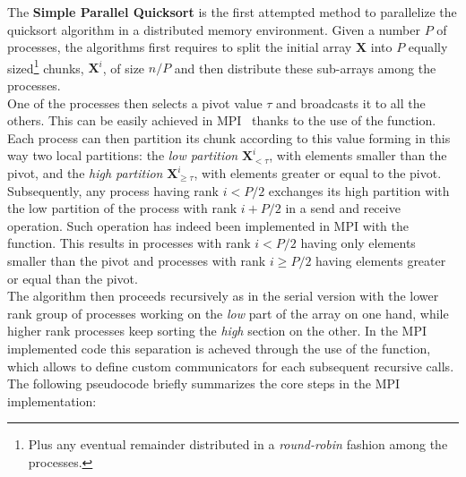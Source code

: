 \documentclass[../main.tex]{subfiles}
\begin{document}
The \textbf{Simple Parallel Quicksort} is the first attempted method to
parallelize the quicksort algorithm in a distributed memory environment.
Given a number $P$ of processes, the algorithms first requires to split the
initial array $\mathbf{X}$ into $P$ equally sized\footnote{Plus any eventual remainder distributed in a \textit{round-robin} fashion among the processes.} chunks, $\mathbf{X}^{i}$, of size $n/P$ and then
distribute these sub-arrays among the processes.\\
One of the processes then selects a pivot value $\tau$ and broadcasts it to all the others. This can be easily achieved in MPI~\cite{mpi} thanks to the use of the  function. Each process can then partition its chunk according to this value forming in this way two local partitions: the \textit{low partition} $\mathbf{X}^{i}_{< \tau}$, with elements smaller than the pivot, and the \textit{high partition} $\mathbf{X}^{i}_{\geq \tau}$, with elements greater or equal to the pivot.\\
Subsequently, any process having rank $i < P/2$ exchanges its high partition
with the low partition of the process with rank $i + P/2$ in a send and receive
operation. Such operation has indeed been implemented in MPI with the  function. This results in processes with rank $i < P/2$  having
only elements smaller than the pivot and processes with rank $i \geq P/2$ having
elements greater or equal than the pivot.\\
The algorithm then proceeds recursively as in the serial version with the lower
rank group of processes working on the \textit{low} part of the array on one hand, while higher rank processes keep sorting the \textit{high} section on the other. In the MPI implemented code this separation is acheved through the use of the  function, which allows to define custom communicators for each subsequent recursive calls.\\
The following pseudocode briefly summarizes the core steps in the MPI implementation:
\end{document}
